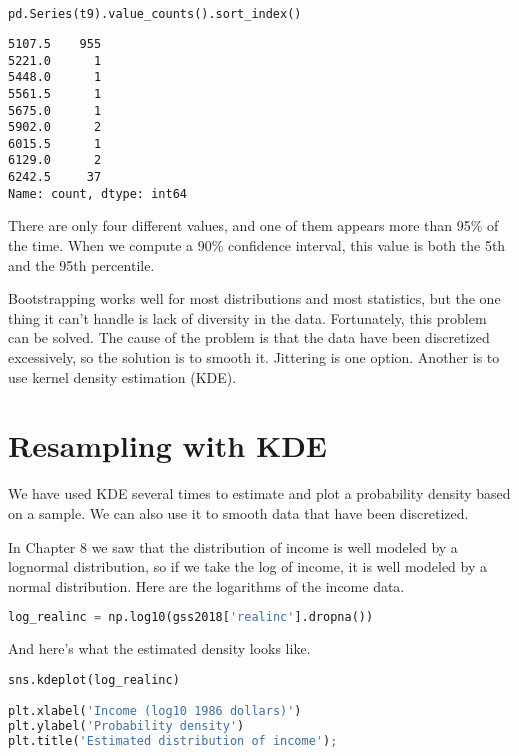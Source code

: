 \begin{lstlisting}[language=Python,style=source]
pd.Series(t9).value_counts().sort_index()
\end{lstlisting}

\begin{lstlisting}[style=output]
5107.5    955
5221.0      1
5448.0      1
5561.5      1
5675.0      1
5902.0      2
6015.5      1
6129.0      2
6242.5     37
Name: count, dtype: int64
\end{lstlisting}

There are only four different values, and one of them appears more than
95\% of the time. When we compute a 90\% confidence interval, this value
is both the 5th and the 95th percentile.

Bootstrapping works well for most distributions and most statistics, but
the one thing it can't handle is lack of diversity in the data.
Fortunately, this problem can be solved. The cause of the problem is
that the data have been discretized excessively, so the solution is to
smooth it. Jittering is one option. Another is to use kernel density
estimation (KDE).

\section{Resampling with KDE}\label{resampling-with-kde}

We have used KDE several times to estimate and plot a probability
density based on a sample. We can also use it to smooth data that have
been discretized.

In Chapter 8 we saw that the distribution of income is well modeled by a
lognormal distribution, so if we take the log of income, it is well
modeled by a normal distribution. Here are the logarithms of the income
data.

\begin{lstlisting}[language=Python,style=source]
log_realinc = np.log10(gss2018['realinc'].dropna())
\end{lstlisting}

And here's what the estimated density looks like.

\begin{lstlisting}[language=Python,style=source]
sns.kdeplot(log_realinc)

plt.xlabel('Income (log10 1986 dollars)')
plt.ylabel('Probability density')
plt.title('Estimated distribution of income');
\end{lstlisting}

